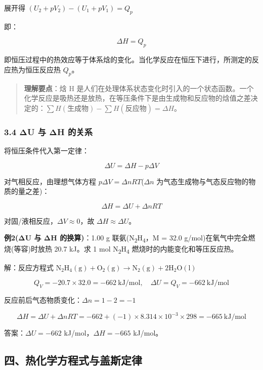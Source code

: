 \documentclass[a4paper,11pt]{ctexart}
\newcommand{\箭}{\ensuremath{\rightarrow}}
\newcommand{\左箭}{\ensuremath{\leftarrow}}
\newcommand{\上箭}{\ensuremath{\uparrow}}
\newcommand{\下箭}{\ensuremath{\downarrow}}
\newcommand{\衡}{\ensuremath{\rightleftharpoons}}
\newcommand{\双箭}{\ensuremath{\leftrightarrow}}
\newcommand{\约等于}{\ensuremath{\approx}}
\newcommand{\小于等于}{\ensuremath{\leq}}
\newcommand{\大于等于}{\ensuremath{\geq}}
\newcommand{\不等于}{\ensuremath{\neq}}
\newcommand{\西格马}{\ensuremath{\sigma}}
\newcommand{\派}{\ensuremath{\pi}}
\begin{document}
展开得 \((U_2 + pV_2) - (U_1 + pV_1) = Q_p\)

即：

\[
\boxed{\Delta H = Q_p}
\]

即恒压过程中的热效应等于体系焓的变化。当化学反应在恒压下进行，所测定的反应热为恒压反应热 \(Q_p\)。

\begin{quote}
\textbf{理解要点}：焓 H 是人们在处理体系状态变化时引入的一个状态函数。一个化学反应是吸热还是放热，在等压条件下是由生成物和反应物的焓值之差决定的：\(\sum H(\text{生成物}) - \sum H(\text{反应物}) = \Delta H\)。
\end{quote}

\subsubsection{3.4 ΔU 与 ΔH 的关系}\label{ux3b4u-ux4e0e-ux3b4h-ux7684ux5173ux7cfb}

将恒压条件代入第一定律：

\[
\Delta U = \Delta H - p\Delta V
\]

对气相反应，由理想气体方程 \(p\Delta V = \Delta nRT\)(\(\Delta n\) 为气态生成物与气态反应物的物质的量之差)：

\[
\boxed{\Delta H = \Delta U + \Delta nRT}
\]

对固/液相反应，\(\Delta V \approx 0\)，故 \(\Delta H \approx \Delta U\)。

\textbf{例2(ΔU 与 ΔH 的换算)}：1.00 g 联氨(N\textsubscript{2}H\textsubscript{4}，M = 32.0 g/mol)在氧气中完全燃烧(等容)时放热 20.7 kJ。求 1 mol N\textsubscript{2}H\textsubscript{4} 燃烧时的内能变化和等压反应热。

解：反应方程式 \(\mathrm{N_2H_4(g) + O_2(g) \to N_2(g) + 2H_2O(l)}\)

\[Q_V = -20.7 \times 32.0 = -662\ \mathrm{kJ/mol}, \quad \Delta U = Q_V = -662\ \mathrm{kJ/mol}\]

反应前后气态物质变化：\(\Delta n = 1 - 2 = -1\)

\[\Delta H = \Delta U + \Delta nRT = -662 + (-1) \times 8.314 \times 10^{-3} \times 298 = -665\ \mathrm{kJ/mol}\]

答案：\(\Delta U = -662\) kJ/mol，\(\Delta H = -665\) kJ/mol。

\subsection{四、热化学方程式与盖斯定律}\label{ux56dbux70edux5316ux5b66ux65b9ux7a0bux5f0fux4e0eux76d6ux65afux5b9aux5f8b}
\end{document}
